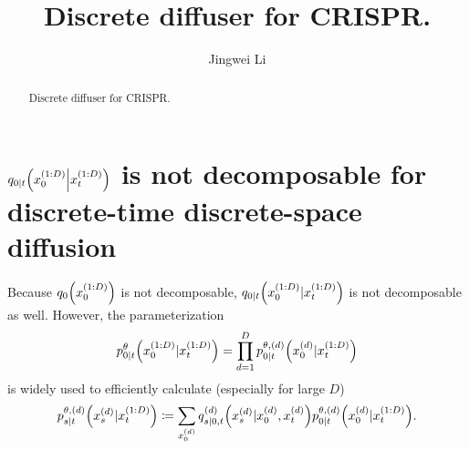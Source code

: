 \documentclass[10pt]{article}
\begin{document}
\title{
  \bf Discrete diffuser for CRISPR.
}

\author[1]{Jingwei Li}

\baselineskip=0pt


%

\maketitle

\begin{abstract}
Discrete diffuser for CRISPR.
\end{abstract}

\section{$q_{0|t}\qty(x^{(1:D)}_0\middle|x^{(1:D)}_t)$ is not decomposable for discrete-time discrete-space diffusion}
Because $q_0\qty(x^{(1:D)}_0)$ is not decomposable, $q_{0|t}\qty(x^{(1:D)}_0|x^{(1:D)}_t)$ is not decomposable as well. However, the parameterization
\begin{eqnarray}\label{Eqp0tCompose}
  p^\theta_{0|t}\qty(x_0^{(1:D)}|x_t^{(1:D)}) = \prod_{d=1}^D p^{\theta,(d)}_{0|t}\qty(x_0^{(d)}|x_t^{(1:D)})
\end{eqnarray}
is widely used to efficiently calculate (especially for large $D$)
\begin{eqnarray*}
  p^{\theta,(d)}_{s|t}\qty(x^{(d)}_s|x^{(1:D)}_t)\coloneq \sum_{x^{(d)}_0}q^{(d)}_{s|0,t}\qty(x^{(d)}_s|x^{(d)}_0,x^{(d)}_t)p^{\theta,(d)}_{0|t}\qty(x^{(d)}_0|x^{(1:D)}_t).
\end{eqnarray*}
\end{document}
